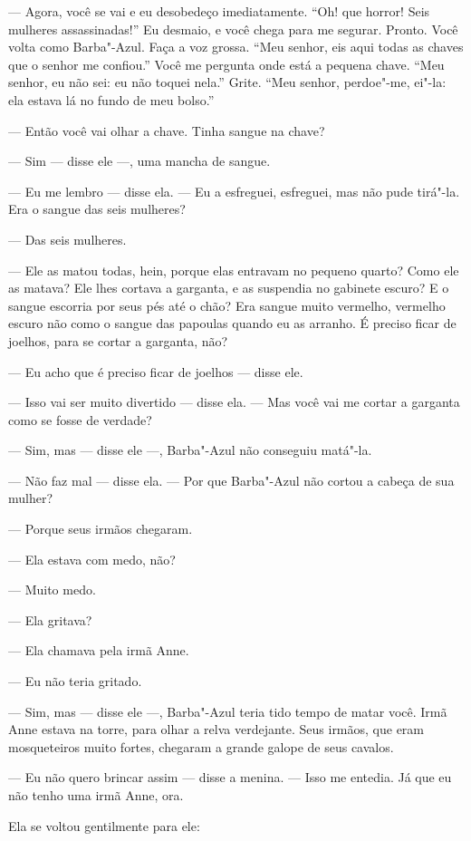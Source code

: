 --- Agora, você se vai e eu desobedeço imediatamente. “Oh! que horror!
Seis mulheres assassinadas!” Eu desmaio, e você chega para me segurar.
Pronto. Você volta como Barba"-Azul. Faça a voz grossa. “Meu senhor, eis
aqui todas as chaves que o senhor me confiou.” Você me pergunta onde está
a pequena chave. “Meu senhor, eu não sei: eu não toquei nela.” Grite. “Meu
senhor, perdoe"-me, ei"-la: ela estava lá no fundo de meu bolso.”

--- Então você vai olhar a chave. Tinha sangue na chave?

--- Sim --- disse ele ---, uma mancha de sangue.

--- Eu me lembro --- disse ela. --- Eu a esfreguei, esfreguei, mas não pude
tirá"-la. Era o sangue das seis mulheres?

--- Das seis mulheres.

--- Ele as matou todas, hein, porque elas entravam no pequeno quarto?
Como ele as matava? Ele lhes cortava a garganta, e as suspendia no
gabinete escuro? E o sangue escorria por seus pés até o chão? Era sangue
muito vermelho, vermelho escuro não como o sangue das papoulas quando eu
as arranho. É preciso ficar de joelhos, para se cortar a garganta, não?

--- Eu acho que é preciso ficar de joelhos --- disse ele.

--- Isso vai ser muito divertido --- disse ela. --- Mas você vai me cortar a
garganta como se fosse de verdade?

--- Sim, mas --- disse ele ---, Barba"-Azul não conseguiu matá"-la.

--- Não faz mal --- disse ela. --- Por que Barba"-Azul não cortou a cabeça de
sua mulher?

--- Porque seus irmãos chegaram.

--- Ela estava com medo, não?

--- Muito medo.

--- Ela gritava?

--- Ela chamava pela irmã Anne.

--- Eu não teria gritado.

--- Sim, mas --- disse ele ---, Barba"-Azul teria tido tempo de matar você. Irmã
Anne estava na torre, para olhar a relva verdejante. Seus irmãos, que eram
mosqueteiros muito fortes, chegaram a grande galope de seus cavalos.

--- Eu não quero brincar assim --- disse a menina. --- Isso me entedia. Já que
eu não tenho uma irmã Anne, ora.

Ela se voltou gentilmente para ele:

